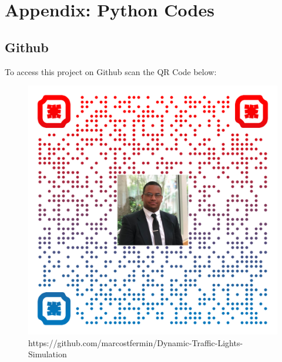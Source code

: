 \documentclass[12pt, a4paper,titlepage]{article}
\begin{document}
\begin{singlespace}  %
	\setlength\bibitemsep{\baselineskip}  %
	\printbibliography[heading=none]
\end{singlespace}

\newpage

\section{Appendix: Python Codes}
\label{sec_codes}

\subsection{Github}

To access this project on Github scan the QR Code below:

\begin{figure}[H]
	\centering
	\includegraphics[width=.9\linewidth]{images/qr-code}
	https://github.com/marcostfermin/Dynamic-Traffic-Lights-Simulation
	\label{fig:qr-code}
\end{figure}


\clearpage
\end{document}
